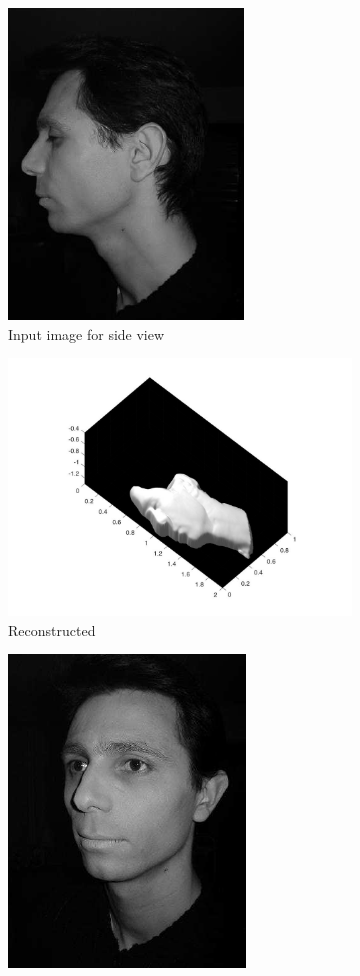 \begin{center}
\begin{figure}
		\begin{subfigure}{0.5\textwidth}
			\centering
			\includegraphics[scale = 0.902]{Images/realface/gleb_side.png}
			\caption{Input image for side view}
		\end{subfigure}
		\begin{subfigure}{0.5\textwidth}
			\centering
			\includegraphics[scale = 0.2]{Images/realface/gleb_side.jpg}
			\caption{Reconstructed}
		\end{subfigure}
		\begin{subfigure}{0.5\textwidth}
			\centering
			\includegraphics[scale = 0.902]{Images/realface/gleb_oblique.png}

\end{subfigure}
\end{figure}
\end{center}
